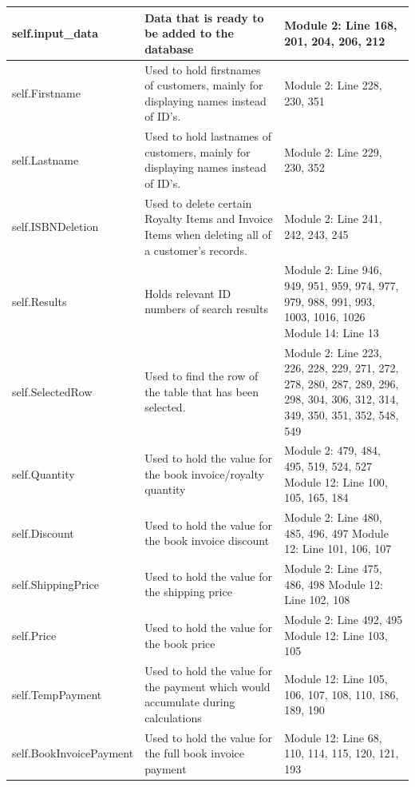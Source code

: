 \begin{center}
\begin{tabular}{|p{3cm}|p{4cm}|p{3cm}|}
    \hline
    self.input\_data & Data that is ready to be added to the database & Module 2: Line 168, 201, 204, 206, 212 \\ \hline
    self.Firstname & Used to hold firstnames of customers, mainly for displaying names instead of ID's. & Module 2: Line 228, 230, 351 \\ \hline
    self.Lastname & Used to hold lastnames of customers, mainly for displaying names instead of ID's. & Module 2: Line 229, 230, 352 \\ \hline
    self.ISBNDeletion & Used to delete certain Royalty Items and Invoice Items when deleting all of a customer's records. & Module 2: Line 241, 242, 243, 245 \\ \hline
    self.Results & Holds relevant ID numbers of search results & Module 2: Line 946, 949, 951, 959, 974, 977, 979, 988, 991, 993, 1003, 1016, 1026 \newline Module 14: Line 13 \\ \hline
    self.SelectedRow & Used to find the row of the table that has been selected. & Module 2: Line 223, 226, 228, 229, 271, 272, 278, 280, 287, 289, 296, 298, 304, 306, 312, 314, 349, 350, 351, 352, 548, 549 \\ \hline
    self.Quantity & Used to hold the value for the book invoice/royalty quantity & Module 2: 479, 484, 495, 519, 524, 527 \newline Module 12: Line 100, 105, 165, 184 \\ \hline
    self.Discount & Used to hold the value for the book invoice discount & Module 2: Line 480, 485, 496, 497 \newline Module 12: Line 101, 106, 107 \\ \hline
    self.ShippingPrice & Used to hold the value for the shipping price & Module 2: Line 475, 486, 498 \newline Module 12: Line 102, 108 \\ \hline
    self.Price & Used to hold the value for the book price & Module 2: Line 492, 495 \newline Module 12: Line 103, 105 \\ \hline
    self.TempPayment & Used to hold the value for the payment which would accumulate during calculations & Module 12: Line 105, 106, 107, 108, 110, 186, 189, 190 \\ \hline
    self.BookInvoicePayment & Used to hold the value for the full book invoice payment & Module 12: Line 68, 110, 114, 115, 120, 121, 193 \\ \hline

\end{tabular}
\end{center}
